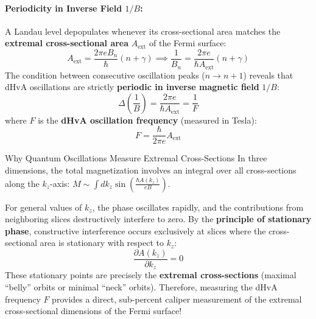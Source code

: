\documentclass[11pt,a4paper]{article}
\begin{document}
\paragraph{Periodicity in Inverse Field $1/B$:}
A Landau level depopulates whenever its cross-sectional area matches the \textbf{extremal cross-sectional area} $A_{\mathrm{ext}}$ of the Fermi surface:
\begin{equation}
A_{\mathrm{ext}} = \frac{2\pi e B_n}{\hbar}\left(n + \gamma\right) \implies \frac{1}{B_n} = \frac{2\pi e}{\hbar A_{\mathrm{ext}}}(n + \gamma)
\end{equation}
The condition between consecutive oscillation peaks ($n \to n+1$) reveals that dHvA oscillations are strictly \textbf{periodic in inverse magnetic field} $1/B$:
\begin{equation}
\boxed{\Delta\left(\frac{1}{B}\right) = \frac{2\pi e}{\hbar A_{\mathrm{ext}}} = \frac{1}{F}}
\label{eq:dhva_period}
\end{equation}
where $F$ is the \textbf{dHvA oscillation frequency} (measured in Tesla):
\begin{equation}
\boxed{F = \frac{\hbar}{2\pi e}A_{\mathrm{ext}}}
\label{eq:dhva_frequency}
\end{equation}

\begin{takeawaybox}{Why Quantum Oscillations Measure Extremal Cross-Sections}
In three dimensions, the total magnetization involves an integral over all cross-sections along the $k_z$-axis: $M \sim \int dk_z \sin\left(\frac{\hbar A(k_z)}{eB}\right)$. 

For general values of $k_z$, the phase oscillates rapidly, and the contributions from neighboring slices destructively interfere to zero. By the \textbf{principle of stationary phase}, constructive interference occurs exclusively at slices where the cross-sectional area is stationary with respect to $k_z$:
\[
\frac{\partial A(k_z)}{\partial k_z} = 0
\]
These stationary points are precisely the \textbf{extremal cross-sections} (maximal ``belly'' orbits or minimal ``neck'' orbits). Therefore, measuring the dHvA frequency $F$ provides a direct, sub-percent caliper measurement of the extremal cross-sectional dimensions of the Fermi surface!
\end{takeawaybox}
\end{document}
